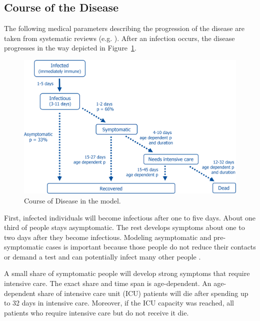 \subsection{Course of the Disease}
\label{sub:course_of_disease}

The following medical parameters describing the progression of the disease are taken
from systematic reviews (e.g. \citet{He2020}). After an infection occurs, the disease
progresses in the way depicted in Figure~\ref{fig:course_of_disease}.

\begin{figure}[!tp]
    \includegraphics[width=\textwidth]{../figures/disease_progression.png}
    \caption{Course of Disease in the model.}
    \label{fig:course_of_disease}
\end{figure}

First, infected individuals will become infectious after one to five days. About one
third of people stays asymptomatic. The rest develops symptoms about one to two days
after they become infectious. Modeling asymptomatic and pre-symptomatic cases is
important because those people do not reduce their contacts or demand a test and can
potentially infect many other people \citep{Donsimoni2020}.

A small share of symptomatic people will develop strong symptoms that require intensive
care. The exact share and time span is age-dependent. An age-dependent share of
intensive care unit (ICU) patients will die after spending up to 32 days in intensive
care. Moreover, if the ICU capacity was reached, all patients who require intensive care
but do not receive it die.

